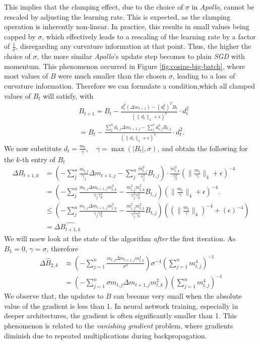This implies that the clamping effect, due to the choice of $\sigma$ in \emph{Apollo}, cannot be rescaled by adjusting the learning rate. 
This is expected, as the clamping operation is inherently non-linear.
In practice, this results in small values being capped by $\sigma$, which effectively leads to a rescaling of the learning rate by a 
factor of $\frac{1}{\sigma}$, disregarding any curvature information at that point. Thus, the higher the choice of $\sigma$,
the more similar \emph{Apollo}'s update step becomes to plain \emph{SGD} with momentum.
This phenomenon occurred in Figure \ref{fig:cosine-big-batch}, where most values of $B$ were much smaller than the chosen $\sigma$,
leading to a loss of curvature information. Therefore we can formulate a condition,which all clamped values of
$B_t$ will satisfy, with
\begin{align}
    &B_{t+1} =  B_t - \frac{d_t^T (\Delta m_{t+1}) - (d_t^2)^T B_t}{\left( \|d_t\|_4 + \epsilon \right)^4} \cdot d_t^2 \\
    &= B_t - \frac{\sum^n_j{d_{t,j}\Delta m_{t+1,j} - \sum^n_j{d_{t,j}^2 B_{t,j} }}}{\left( \|d_t\|_4 + \epsilon \right)^4} \cdot d_t^2.
\end{align}
We now substitute $d_t = \frac{m_t}{\gamma}, \quad \gamma = \max(|B_t|, \sigma)$, and obtain the following for the $k$-th entry of $B_t$
\begin{align*}
    \Delta B_{t+1,k} &=\left(-\displaystyle\sum^n_j \frac{m_{t,j}}{\gamma_j } \Delta m_{t+1,j} - \displaystyle\sum^n_j \frac{m_{t,j}^2}{\gamma_j ^2} B_{t,j}\right) \cdot \frac{m_{t,k}^2}{\gamma_k^2} \left( \|\frac{m_t}{\gamma}\|_4 + \epsilon \right)^{-4}  \\
    &= \left(-\displaystyle\sum^n_j \frac{m_{t,j}\Delta m_{t+1,j}m_{t,k}^2}{\gamma_j \gamma_k^2} - \frac{m_{t,j}^2m_{t,k}^2}{\gamma_j ^2\gamma_k^2} B_{t,j}\right) \left( \|\frac{m_t}{\gamma}\|_4 + \epsilon \right)^{-4}.  \\
    &\leq \left(-\displaystyle\sum^n_j \frac{m_{t,j}\Delta m_{t+1,j}m_{t,k}^2}{\gamma_j \gamma_k^2} - \frac{m_{t,j}^2m_{t,k}^2}{\gamma_j ^2\gamma_k^2} B_{t,j}\right) \left(\left( \|\frac{m_t}{\gamma}\|_4\right)^{-4} + \left(\epsilon \right)^{-4}\right) \\
    &=  \Delta \hat{B_{t+1,k}}
\end{align*}
We will noew look at the state of the algorithm \emph{after} the first iteration. As $B_1 = 0$, $\gamma = \sigma$, therefore
\begin{align*}
    \Delta \hat{B}_{2,k} &\approx \left(-\sum_{j=1}^{n} \frac{m_{t,j} \Delta m_{t+1,j} m_{t,k}^2}{\sigma^3}  \right) \sigma^{-4} \left(\sum_{j=1}^{n} m_{t,j}^{4} \right)^{-1}\\
    &=  \left(-\sum_{j=1}^{n} \sigma m_{t,j} \Delta m_{t+1,j} m_{t,k}^2\right)  \left(\sum_{j=1}^{n} m_{t,j}^{4} \right)^{-1}
\end{align*}
We observe that, the updates to $B$ can become very small when
the absolute value of the gradient is less than 1. In neural network training, especially in deeper architectures,
the gradient is often significantly smaller than 1. This phenomenon is related to the \emph{vanishing gradient}
problem, where gradients diminish due to repeated multiplications during backpropagation. 


